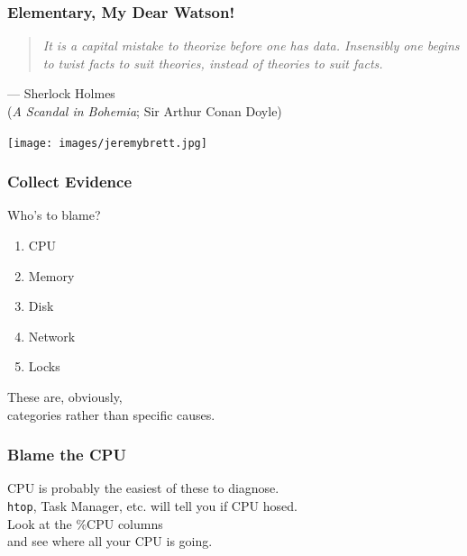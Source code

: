 \begin{frame}
\frametitle{Elementary, My Dear Watson!}


\begin{changemargin}{1cm}
\begin{quote}
\textit{It is a capital mistake to theorize before one has data. Insensibly one begins to twist facts to suit theories, instead of theories to suit facts.}
\end{quote}
\hfill --- Sherlock Holmes\\
\hfill (\textit{A Scandal in Bohemia}; Sir Arthur Conan Doyle)
\end{changemargin}

\begin{center}
	\texttt{[image: images/jeremybrett.jpg]}
\end{center}

\end{frame}



\begin{frame}
\frametitle{Collect Evidence}


\begin{changemargin}{1cm}
Who's to blame?
\begin{enumerate}
	\item CPU
	\item Memory
	\item Disk
	\item Network
	\item Locks
\end{enumerate}

These are, obviously, \\
categories rather than specific causes.
\end{changemargin}
\end{frame}



\begin{frame}
\frametitle{Blame the CPU}


\begin{changemargin}{1cm}
CPU is probably the easiest of these to diagnose. \\[1em]
\texttt{htop}, Task Manager, etc. will tell you if CPU hosed.\\
Look at the \%CPU columns\\
and see where all your CPU is going. 
\end{changemargin}


\end{frame}




